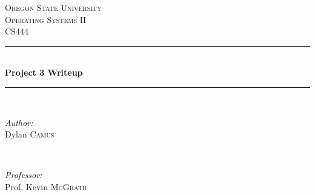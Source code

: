 \documentclass[journal,letterpaper,draftclsnofoot,onecolumn,10pt]{IEEEtran}
\begin{document}
\begin{titlepage}

\newcommand{\HRule}{\rule{\linewidth}{0.5mm}} %

\center %
 

\textsc{\LARGE Oregon State University}\\[1.5cm] %
\textsc{\Large Operating Systems II}\\[0.5cm] %
\textsc{\large CS444}\\[0.5cm] %


\HRule \\[0.4cm]
{ \huge \bfseries Project 3 Writeup}\\[0.4cm] %
\HRule \\[1.5cm]
 

\begin{minipage}{0.4\textwidth}
   \begin{flushleft} \large
      \emph{Author:}\\
      Dylan \textsc{Camus} %
   \end{flushleft}
\end{minipage}
~
\begin{minipage}{0.4\textwidth}
   \begin{flushright} \large
      \emph{Professor:} \\
      Prof. Kevin \textsc{McGrath} %
   \end{flushright}
\end{minipage}\\[4cm]



\end{titlepage}
\end{document}
